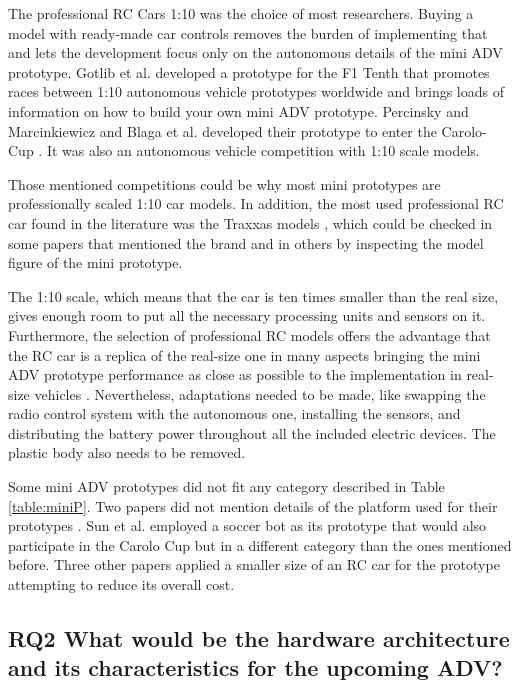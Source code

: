 \documentclass[lettersize,journal]{IEEEtran}
\begin{document}
The professional RC Cars 1:10 was the choice of most researchers. Buying a model with ready-made car controls removes the burden of implementing that and lets the development focus only on the autonomous details of the mini ADV prototype. Gotlib et al. \cite{Gotlib2019} developed a prototype for the F1 Tenth \cite{F1tenth} that promotes races between 1:10 autonomous vehicle prototypes worldwide and brings loads of information on how to build your own mini ADV prototype. Percinsky and Marcinkiewicz \cite{Percinski2018} and Blaga et al. \cite{deac2018} developed their prototype to enter the Carolo-Cup \cite{Carolo}. It was also an autonomous vehicle competition with 1:10 scale models.

Those mentioned competitions could be why most mini prototypes are professionally scaled 1:10 car models. In addition, the most used professional RC car found in the literature was the Traxxas models \cite{Traxxas}, which could be checked in some papers that mentioned the brand and in others by inspecting the model figure of the mini prototype.

The 1:10 scale, which means that the car is ten times smaller than the real size, gives enough room to put all the necessary processing units and sensors on it. Furthermore, the selection of professional RC models offers the advantage that the RC car is a replica of the real-size one in many aspects bringing the mini ADV prototype performance as close as possible to the implementation in real-size vehicles \cite{Walambe2019} \cite{Zhou2019}. Nevertheless, adaptations needed to be made, like swapping the radio control system with the autonomous one, installing the sensors, and distributing the battery power throughout all the included electric devices. The plastic body also needs to be removed.

Some mini ADV prototypes did not fit any category described in Table \ref{table:miniP}. Two papers did not mention details of the platform used for their prototypes \cite{chaitra2020}\cite{pannu2015}. Sun et al. \cite{Sun2019} employed a soccer bot as its prototype that would also participate in the Carolo Cup but in a different category than the ones mentioned before. Three other papers \cite{Bechtel2019,jain2018,pehlivan2020}
 applied a smaller size of an RC car for the prototype attempting to reduce its overall cost.

\subsection {\textbf{RQ2 What would be the hardware architecture and its characteristics for the upcoming ADV?}}
\end{document}
